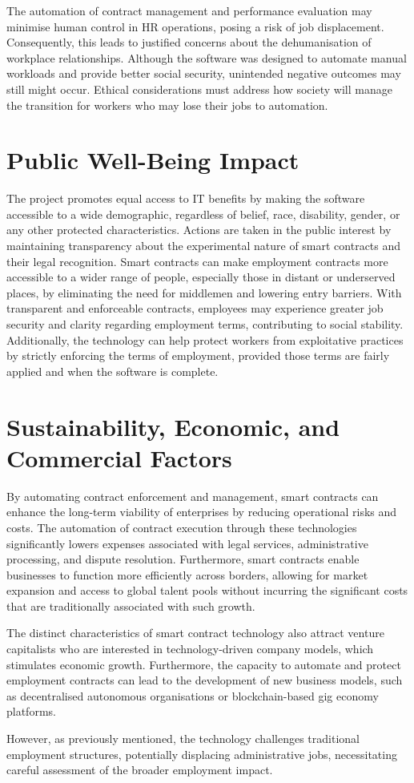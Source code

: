 The automation of contract management and performance evaluation may minimise human control in HR operations, posing a risk of job displacement. Consequently, this leads to justified concerns about the dehumanisation of workplace relationships. Although the software was designed to automate manual workloads and provide better social security, unintended negative outcomes may still might occur. Ethical considerations must address how society will manage the transition for workers who may lose their jobs to automation.

\section{Public Well-Being Impact}

The project promotes equal access to IT benefits by making the software accessible to a wide demographic, regardless of belief, race, disability, gender, or any other protected characteristics. Actions are taken in the public interest by maintaining transparency about the experimental nature of smart contracts and their legal recognition. Smart contracts can make employment contracts more accessible to a wider range of people, especially those in distant or underserved places, by eliminating the need for middlemen and lowering entry barriers. With transparent and enforceable contracts, employees may experience greater job security and clarity regarding employment terms, contributing to social stability. Additionally, the technology can help protect workers from exploitative practices by strictly enforcing the terms of employment, provided those terms are fairly applied and when the software is complete.

\section{Sustainability, Economic, and Commercial Factors}

By automating contract enforcement and management, smart contracts can enhance the long-term viability of enterprises by reducing operational risks and costs. The automation of contract execution through these technologies significantly lowers expenses associated with legal services, administrative processing, and dispute resolution. Furthermore, smart contracts enable businesses to function more efficiently across borders, allowing for market expansion and access to global talent pools without incurring the significant costs that are traditionally associated with such growth.

The distinct characteristics of smart contract technology also attract venture capitalists who are interested in technology-driven company models, which stimulates economic growth. Furthermore, the capacity to automate and protect employment contracts can lead to the development of new business models, such as decentralised autonomous organisations or blockchain-based gig economy platforms.

However, as previously mentioned, the technology challenges traditional employment structures, potentially displacing administrative jobs, necessitating careful assessment of the broader employment impact.